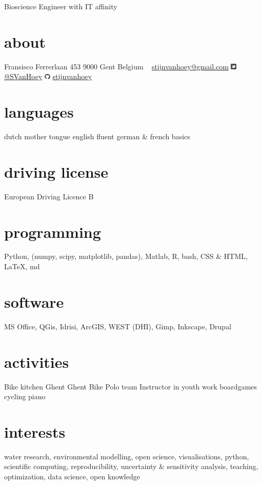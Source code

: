 \documentclass[]{stvhoey-cv}  %
\begin{document}
       {Bioscience Engineer with IT affinity}

\begin{aside}
  \section{about}
    Fransisco Ferrerlaan 453
    9000 Gent
    Belgium
    ~
    \href{mailto:stijnvanhoey@gmail.com}{stijnvanhoey@gmail.com}
    	\includegraphics[height=8pt]{twitter.pdf} \href{https://twitter.com/svanhoey}{@SVanHoey}
	\includegraphics[height=8pt]{github.pdf} \href{http://github.com/stijnvanhoey}{stijnvanhoey}%
  \section{languages}
    dutch mother tongue
    english fluent
   german \&  french basics
  \section{driving license}
  European Driving
  Licence B
  \section{programming}
   Python, %
    (numpy, scipy,
    matplotlib, pandas),
    Matlab, R, bash,
    CSS \& HTML,
    \LaTeX, md
  \section{software}
   MS Office,
   QGis, Idrisi, ArcGIS,
   WEST (DHI),
   Gimp, Inkscape,
   Drupal
   \section{activities}
   Bike kitchen Ghent
   Ghent Bike Polo team
   Instructor in youth work
   boardgames
   cycling
   piano    
\end{aside}
   
\section{interests}
water research, environmental modelling, open science, visualisations, python, scientific computing, reproducibility, uncertainty \& sensitivity analysis, teaching, optimization, data science, open knowledge \vspace{\baselineskip}
\end{document}
